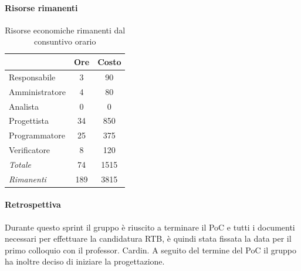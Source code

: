 \documentclass[a4paper,12pt]{article}
\begin{document}
            \paragraph{Risorse rimanenti}
                \begin{table}[H]
                \centering
                \caption{Risorse economiche rimanenti dal consuntivo orario}
                \begin{tabular}{|l|c|c|}
                \hline
                    \rowcolor{lightgray}{\textbf{Ruolo}} & {\textbf{Ore}} & {\textbf{Costo}}\\
                \hline
                    Responsabile & 3 & 90\\
                \hline
                    Amministratore & 4 & 80\\
                \hline
                    Analista & 0 & 0\\
                \hline
                    Progettista & 34 & 850\\
                \hline
                    Programmatore & 25 & 375\\
                \hline
                    Verificatore & 8 & 120\\
                \hline
                    \rowcolor{lightgray}\textit{Totale} & 74 & 1515\\
                \hline
                    \rowcolor{lightgray}\textit{Rimanenti} & 189 & 3815\\
                \hline
                \end{tabular}
                \end{table}
                
            \paragraph{Retrospettiva}
            Durante questo sprint il gruppo è riuscito a terminare il PoC e tutti i documenti necessari per effettuare la candidatura RTB, è quindi stata fissata la data per il primo colloquio con il professor. Cardin. A seguito del termine del PoC il gruppo ha inoltre deciso di iniziare la progettazione.
            
\end{document}

